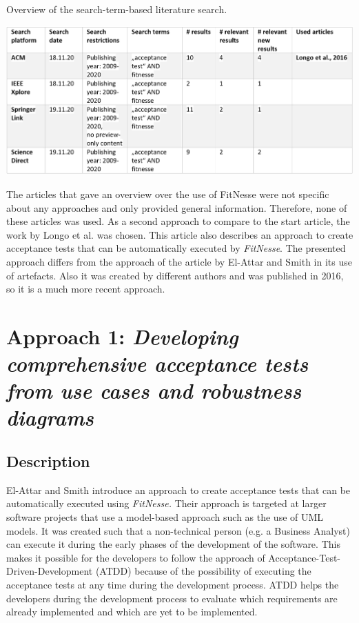 \begin{table}[H]
	\caption{Overview of the search-term-based literature search.}
	\includegraphics[width=\textwidth]{../images/LitSearchFitnesse.png} 
	
	\label{fig:lit-search-fitnesse}
\end{table}


The articles that gave an overview over the use of FitNesse were not specific about any approaches and only provided general information.
Therefore, none of these articles was used.
As a second approach to compare to the start article, the work by Longo et al. \cite{longo} was chosen.
This article also describes an approach to create acceptance tests that can be automatically executed by \textit{FitNesse}.
The presented approach differs from the approach of the article by El-Attar and Smith in its use of artefacts.
Also it was created by different authors and was published in 2016, so it is a much more recent approach.


\section{Approach 1: \textit{Developing comprehensive acceptance tests from use cases and robustness diagrams}}
\label{sec:el-attar}

\subsection{Description}

El-Attar and Smith \cite{el-attar} introduce an approach to create acceptance tests that can be automatically executed using \textit{FitNesse.}
Their approach is targeted at larger software projects that use a model-based approach such as the use of UML models. 
It was created such that a non-technical person (e.g. a Business Analyst) can execute it during the early phases of the development of the software.
This makes it possible for the developers to follow the approach of Acceptance-Test-Driven-Development (ATDD) because of the possibility of executing the acceptance tests at any time during the development process.
ATDD helps the developers during the development process to evaluate which requirements are already implemented and  which are yet to be implemented.

